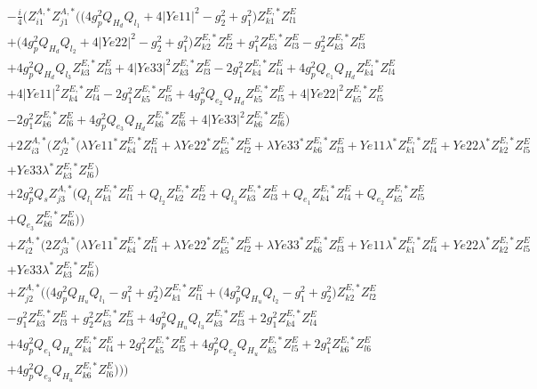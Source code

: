 \begin{align} 
 &-\frac{i}{4} \Big(Z^{A,*}_{i 1} Z^{A,*}_{j 1} \Big(\Big(4 g_{p}^{2} Q_{H_d} Q_{l_1}  + 4 |Ye11|^2  - g_{2}^{2}  + g_{1}^{2}\Big)Z^{E,*}_{k 1} Z_{{l 1}}^{E} \nonumber \\ 
 &+\Big(4 g_{p}^{2} Q_{H_d} Q_{l_2}  + 4 |Ye22|^2  - g_{2}^{2}  + g_{1}^{2}\Big)Z^{E,*}_{k 2} Z_{{l 2}}^{E} +g_{1}^{2} Z^{E,*}_{k 3} Z_{{l 3}}^{E} - g_{2}^{2} Z^{E,*}_{k 3} Z_{{l 3}}^{E} \nonumber \\ 
 &+4 g_{p}^{2} Q_{H_d} Q_{l_3} Z^{E,*}_{k 3} Z_{{l 3}}^{E} +4 |Ye33|^2 Z^{E,*}_{k 3} Z_{{l 3}}^{E} -2 g_{1}^{2} Z^{E,*}_{k 4} Z_{{l 4}}^{E} +4 g_{p}^{2} Q_{e_{1}} Q_{H_d} Z^{E,*}_{k 4} Z_{{l 4}}^{E} \nonumber \\ 
 &+4 |Ye11|^2 Z^{E,*}_{k 4} Z_{{l 4}}^{E} -2 g_{1}^{2} Z^{E,*}_{k 5} Z_{{l 5}}^{E} +4 g_{p}^{2} Q_{e_{2}} Q_{H_d} Z^{E,*}_{k 5} Z_{{l 5}}^{E} +4 |Ye22|^2 Z^{E,*}_{k 5} Z_{{l 5}}^{E} \nonumber \\ 
 &-2 g_{1}^{2} Z^{E,*}_{k 6} Z_{{l 6}}^{E} +4 g_{p}^{2} Q_{e_3} Q_{H_d} Z^{E,*}_{k 6} Z_{{l 6}}^{E} +4 |Ye33|^2 Z^{E,*}_{k 6} Z_{{l 6}}^{E} \Big)\nonumber \\ 
 &+2 Z^{A,*}_{i 3} \Big(Z^{A,*}_{j 2} \Big(\lambda Ye11^* Z^{E,*}_{k 4} Z_{{l 1}}^{E} +\lambda Ye22^* Z^{E,*}_{k 5} Z_{{l 2}}^{E} +\lambda Ye33^* Z^{E,*}_{k 6} Z_{{l 3}}^{E} +Ye11 \lambda^* Z^{E,*}_{k 1} Z_{{l 4}}^{E} +Ye22 \lambda^* Z^{E,*}_{k 2} Z_{{l 5}}^{E} \nonumber \\ 
 &+Ye33 \lambda^* Z^{E,*}_{k 3} Z_{{l 6}}^{E} \Big)\nonumber \\ 
 &+2 g_{p}^{2} Q_s Z^{A,*}_{j 3} \Big(Q_{l_1} Z^{E,*}_{k 1} Z_{{l 1}}^{E} +Q_{l_2} Z^{E,*}_{k 2} Z_{{l 2}}^{E} +Q_{l_3} Z^{E,*}_{k 3} Z_{{l 3}}^{E} +Q_{e_{1}} Z^{E,*}_{k 4} Z_{{l 4}}^{E} +Q_{e_{2}} Z^{E,*}_{k 5} Z_{{l 5}}^{E} \nonumber \\ 
 &+Q_{e_3} Z^{E,*}_{k 6} Z_{{l 6}}^{E} \Big)\Big)\nonumber \\ 
 &+Z^{A,*}_{i 2} \Big(2 Z^{A,*}_{j 3} \Big(\lambda Ye11^* Z^{E,*}_{k 4} Z_{{l 1}}^{E} +\lambda Ye22^* Z^{E,*}_{k 5} Z_{{l 2}}^{E} +\lambda Ye33^* Z^{E,*}_{k 6} Z_{{l 3}}^{E} +Ye11 \lambda^* Z^{E,*}_{k 1} Z_{{l 4}}^{E} +Ye22 \lambda^* Z^{E,*}_{k 2} Z_{{l 5}}^{E} \nonumber \\ 
 &+Ye33 \lambda^* Z^{E,*}_{k 3} Z_{{l 6}}^{E} \Big)\nonumber \\ 
 &+Z^{A,*}_{j 2} \Big(\Big(4 g_{p}^{2} Q_{H_u} Q_{l_1}  - g_{1}^{2}  + g_{2}^{2}\Big)Z^{E,*}_{k 1} Z_{{l 1}}^{E} +\Big(4 g_{p}^{2} Q_{H_u} Q_{l_2}  - g_{1}^{2}  + g_{2}^{2}\Big)Z^{E,*}_{k 2} Z_{{l 2}}^{E} \nonumber \\ 
 &- g_{1}^{2} Z^{E,*}_{k 3} Z_{{l 3}}^{E} +g_{2}^{2} Z^{E,*}_{k 3} Z_{{l 3}}^{E} +4 g_{p}^{2} Q_{H_u} Q_{l_3} Z^{E,*}_{k 3} Z_{{l 3}}^{E} +2 g_{1}^{2} Z^{E,*}_{k 4} Z_{{l 4}}^{E} \nonumber \\ 
 &+4 g_{p}^{2} Q_{e_{1}} Q_{H_u} Z^{E,*}_{k 4} Z_{{l 4}}^{E} +2 g_{1}^{2} Z^{E,*}_{k 5} Z_{{l 5}}^{E} +4 g_{p}^{2} Q_{e_{2}} Q_{H_u} Z^{E,*}_{k 5} Z_{{l 5}}^{E} +2 g_{1}^{2} Z^{E,*}_{k 6} Z_{{l 6}}^{E} \nonumber \\ 
 &+4 g_{p}^{2} Q_{e_3} Q_{H_u} Z^{E,*}_{k 6} Z_{{l 6}}^{E} \Big)\Big)\Big)\end{align} 
